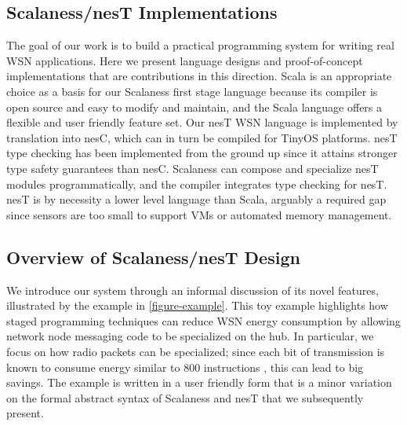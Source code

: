 \subsection{Scalaness/nesT Implementations}

The goal of our work is to build a practical programming system for writing real WSN
applications. Here we present language designs and proof-of-concept implementations that are
contributions in this direction. Scala is an appropriate choice as a basis for our Scalaness
first stage language because its compiler is open source and easy to modify and maintain, and
the Scala language offers a flexible and user friendly feature set.
%
Our nesT WSN language is implemented by translation into nesC,
which can in turn be compiled for TinyOS platforms.
nesT type checking has been implemented from the ground up since it attains stronger type safety
guarantees than nesC. Scalaness can compose and specialize nesT modules programmatically, and
the compiler integrates type checking for nesT. nesT is by necessity a lower level language than
Scala, arguably a required gap since sensors are too small to support VMs or automated memory
management.

\subsection{Overview of Scalaness/nesT Design}

We introduce our system through an informal discussion of its novel features, illustrated by the
example in \autoref{figure-example}. This toy example highlights how staged programming
techniques can reduce WSN energy consumption by allowing network node messaging code to be
specialized on the hub. In particular, we focus on how radio packets can be specialized; since
each bit of transmission is known to consume energy similar to 800 instructions \cite{tag}, this
can lead to big savings. The example is written in a user friendly form that is a minor
variation on the formal abstract syntax of Scalaness and nesT that we subsequently present.

